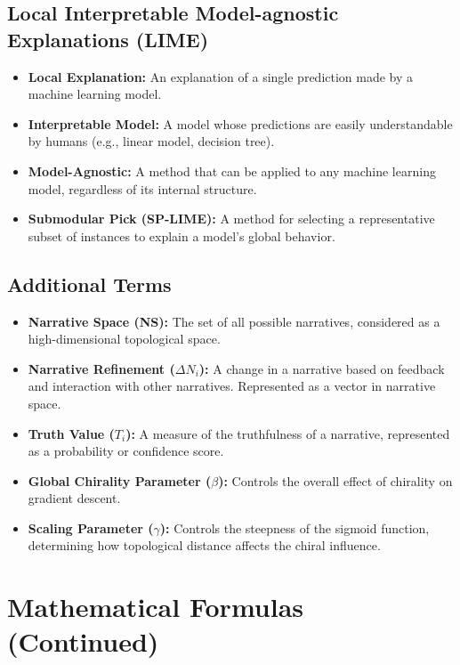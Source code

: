 \documentclass[12pt, a4paper]{article}
\begin{document}
\subsection{Local Interpretable Model-agnostic Explanations (LIME)}

\begin{itemize}
    \item \textbf{Local Explanation:}  An explanation of a single prediction made by a machine learning model.
    \item \textbf{Interpretable Model:}  A model whose predictions are easily understandable by humans (e.g., linear model, decision tree).
    \item \textbf{Model-Agnostic:} A method that can be applied to any machine learning model, regardless of its internal structure.
    \item \textbf{Submodular Pick (SP-LIME): } A method for selecting a representative subset of instances to explain a model's global behavior.
\end{itemize}


\subsection{Additional Terms}

\begin{itemize}
    \item \textbf{Narrative Space (NS): } The set of all possible narratives, considered as a high-dimensional topological space.
    \item \textbf{Narrative Refinement ($\Delta N_i$): } A change in a narrative based on feedback and interaction with other narratives.  Represented as a vector in narrative space.
    \item \textbf{Truth Value ($T_i$): } A measure of the truthfulness of a narrative, represented as a probability or confidence score.
    \item \textbf{Global Chirality Parameter ($\beta$): } Controls the overall effect of chirality on gradient descent.
    \item \textbf{Scaling Parameter ($\gamma$): }  Controls the steepness of the sigmoid function, determining how topological distance affects the chiral influence.
\end{itemize}


\section{Mathematical Formulas (Continued)}
\end{document}
